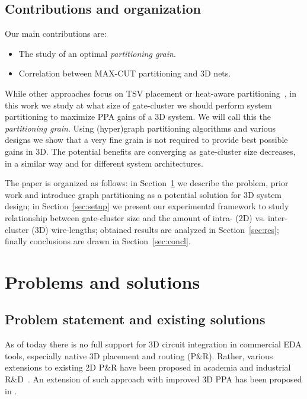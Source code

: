 \documentclass[conference]{IEEEtran}
\begin{document}
\subsection{Contributions and organization}
Our main contributions are:
\begin{itemize}
    \item The study of an optimal \textit{partitioning grain}.
    \item Correlation between MAX-CUT partitioning and 3D nets.
\end{itemize}

While other approaches focus on TSV placement or heat-aware partitioning~\cite{Athikulwongse2014}, in this work we study at what size of gate-cluster we should perform system partitioning to maximize PPA gains of a 3D system. We will call this the \textit{partitioning grain}. Using (hyper)graph partitioning algorithms and various designs we show that a very fine grain is not required to provide best possible gains in 3D. The potential benefits are converging as gate-cluster size decreases, in a similar way and for different system architectures.

The paper is organized as follows: in Section~\ref{sec:optobj} we describe the problem, prior work and introduce graph partitioning as a potential solution for 3D system design; in Section~\ref{sec:setup} we present our experimental framework to study relationship between gate-cluster size and the amount of intra- (2D) vs. inter-cluster (3D) wire-lengths; obtained results are analyzed in Section~\ref{sec:res}; finally conclusions are drawn in Section~\ref{sec:concl}.

\section{Problems and solutions}\label{sec:optobj}
\subsection{Problem statement and existing solutions}
As of today there is no full support for 3D circuit integration in commercial EDA tools, especially native 3D placement and routing (P\&R). Rather, various extensions to existing 2D P\&R have been proposed in academia and industrial R\&D~\cite{Panth}. An extension of such approach with improved 3D PPA has been proposed in \cite{Chang2016}. 
\end{document}
